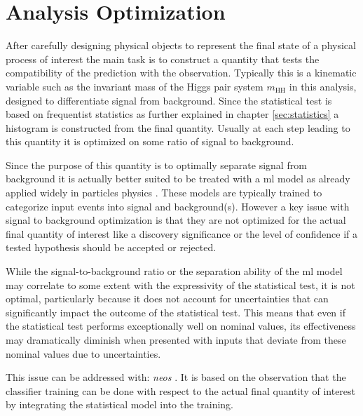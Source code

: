 \chapter{Analysis Optimization}\label{sec:analysis_optimization}
After carefully designing physical objects to represent the final state of a physical process of interest the main task is to construct a quantity that tests the compatibility of the prediction with the observation. Typically this is a kinematic variable such as the invariant mass of the Higgs pair system $m_\text{HH}$ in this analysis, designed to differentiate signal from background. Since the statistical test is based on frequentist statistics as further explained in chapter \ref{sec:statistics} a histogram is constructed from the final quantity. Usually at each step leading to this quantity it is optimized on some ratio of signal to background.

Since the purpose of this quantity is to optimally separate signal from background it is actually better suited to be treated with a \ac{ml} model as already applied widely in particles physics \citep{albertsson2019machine,shlomi2020graph,feickert2021living,Schwartz2021Modern}. These models are typically trained to categorize input events into signal and background(s). However a key issue with signal to background optimization is that they are not optimized for the actual final quantity of interest like a discovery significance or the level of confidence if a tested hypothesis should be accepted or rejected.

While the signal-to-background ratio or the separation ability of the \ac{ml} model may correlate to some extent with the expressivity of the statistical test, it is not optimal, particularly because it does not account for uncertainties that can significantly impact the outcome of the statistical test. This means that even if the statistical test performs exceptionally well on nominal values, its effectiveness may dramatically diminish when presented with inputs that deviate from these nominal values due to uncertainties.

This issue can be addressed with: \textit{\ac{neos}} \citep{Simpson_2023}. It is based on the observation that the classifier training can be done with respect to the actual final quantity of interest by integrating the statistical model into the training.


